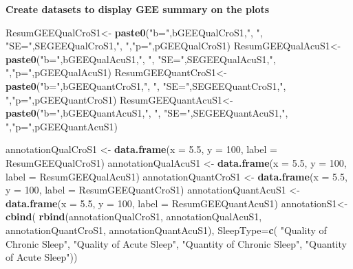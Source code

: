 \documentclass[
]{book}
\newenvironment{Shaded}{\begin{snugshade}}{\end{snugshade}}
\newcommand{\DataTypeTok}[1]{\textcolor[rgb]{0.13,0.29,0.53}{#1}}
\newcommand{\DecValTok}[1]{\textcolor[rgb]{0.00,0.00,0.81}{#1}}
\newcommand{\FloatTok}[1]{\textcolor[rgb]{0.00,0.00,0.81}{#1}}
\newcommand{\KeywordTok}[1]{\textcolor[rgb]{0.13,0.29,0.53}{\textbf{#1}}}
\newcommand{\NormalTok}[1]{#1}
\newcommand{\StringTok}[1]{\textcolor[rgb]{0.31,0.60,0.02}{#1}}
\begin{document}
\textbf{Create datasets to display GEE summary on the plots}

\begin{Shaded}
\begin{Highlighting}[]
\NormalTok{ResumGEEQualCroS1<-}\StringTok{ }\KeywordTok{paste0}\NormalTok{(}\StringTok{"b="}\NormalTok{,bGEEQualCroS1,}\StringTok{", "}\NormalTok{, }\StringTok{"SE="}\NormalTok{,SEGEEQualCroS1,}\StringTok{", "}\NormalTok{,}\StringTok{"p="}\NormalTok{,pGEEQualCroS1)}
\NormalTok{ResumGEEQualAcuS1<-}\StringTok{ }\KeywordTok{paste0}\NormalTok{(}\StringTok{"b="}\NormalTok{,bGEEQualAcuS1,}\StringTok{", "}\NormalTok{, }\StringTok{"SE="}\NormalTok{,SEGEEQualAcuS1,}\StringTok{", "}\NormalTok{,}\StringTok{"p="}\NormalTok{,pGEEQualAcuS1)}
\NormalTok{ResumGEEQuantCroS1<-}\StringTok{ }\KeywordTok{paste0}\NormalTok{(}\StringTok{"b="}\NormalTok{,bGEEQuantCroS1,}\StringTok{", "}\NormalTok{, }\StringTok{"SE="}\NormalTok{,SEGEEQuantCroS1,}\StringTok{", "}\NormalTok{,}\StringTok{"p="}\NormalTok{,pGEEQuantCroS1)}
\NormalTok{ResumGEEQuantAcuS1<-}\StringTok{ }\KeywordTok{paste0}\NormalTok{(}\StringTok{"b="}\NormalTok{,bGEEQuantAcuS1,}\StringTok{", "}\NormalTok{, }\StringTok{"SE="}\NormalTok{,SEGEEQuantAcuS1,}\StringTok{", "}\NormalTok{,}\StringTok{"p="}\NormalTok{,pGEEQuantAcuS1)}

\NormalTok{annotationQualCroS1 <-}\StringTok{ }\KeywordTok{data.frame}\NormalTok{(}\DataTypeTok{x =} \FloatTok{5.5}\NormalTok{, }\DataTypeTok{y =} \DecValTok{100}\NormalTok{,  }\DataTypeTok{label =}\NormalTok{ ResumGEEQualCroS1)}
\NormalTok{annotationQualAcuS1 <-}\StringTok{ }\KeywordTok{data.frame}\NormalTok{(}\DataTypeTok{x =} \FloatTok{5.5}\NormalTok{, }\DataTypeTok{y =} \DecValTok{100}\NormalTok{,  }\DataTypeTok{label =}\NormalTok{ ResumGEEQualAcuS1)}
\NormalTok{annotationQuantCroS1 <-}\StringTok{ }\KeywordTok{data.frame}\NormalTok{(}\DataTypeTok{x =} \FloatTok{5.5}\NormalTok{, }\DataTypeTok{y =} \DecValTok{100}\NormalTok{,  }\DataTypeTok{label =}\NormalTok{ ResumGEEQuantCroS1)}
\NormalTok{annotationQuantAcuS1 <-}\StringTok{ }\KeywordTok{data.frame}\NormalTok{(}\DataTypeTok{x =} \FloatTok{5.5}\NormalTok{, }\DataTypeTok{y =} \DecValTok{100}\NormalTok{,  }\DataTypeTok{label =}\NormalTok{ ResumGEEQuantAcuS1)}
\NormalTok{annotationS1<-}\KeywordTok{cbind}\NormalTok{(}
  \KeywordTok{rbind}\NormalTok{(annotationQualCroS1, }
\NormalTok{        annotationQualAcuS1, }
\NormalTok{        annotationQuantCroS1, }
\NormalTok{        annotationQuantAcuS1),}
  \DataTypeTok{SleepType=}\KeywordTok{c}\NormalTok{(}
        \StringTok{"Quality of Chronic Sleep"}\NormalTok{, }
        \StringTok{"Quality of Acute Sleep"}\NormalTok{, }
        \StringTok{"Quantity of Chronic Sleep"}\NormalTok{, }
        \StringTok{"Quantity of Acute Sleep"}\NormalTok{))}
\end{Highlighting}
\end{Shaded}
\end{document}

